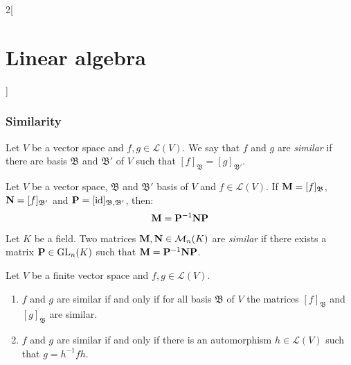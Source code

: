 \documentclass[../../../main.tex]{subfiles}
\begin{document}
\begin{multicols}{2}[\section{Linear algebra}]
  \subsubsection*{Similarity}
  \begin{definition}
    Let $V$ be a vector space and $f,g\in\mathcal{L}(V)$. We say that $f$ and $g$ are \textit{similar} if there are basis $\mathfrak{B}$ and $\mathfrak{B}'$ of $V$ such that $[f]_\mathfrak{B}=[g]_{\mathfrak{B}'}$.
  \end{definition}
  \begin{lemma}
    Let $V$ be a vector space, $\mathfrak{B}$ and $\mathfrak{B}'$ basis of $V$ and $f\in\mathcal{L}(V)$. If $\vb{M}=[f]_\mathfrak{B}$, $\vb{N}=[f]_{\mathfrak{B}'}$ and $\vb{P}=[\mathrm{id}]_{\mathfrak{B},\mathfrak{B}'}$, then: $$\vb{M}=\vb{P}^{-1}\vb{N}\vb{P}$$
  \end{lemma}
  \begin{definition}
    Let $K$ be a field. Two matrices $\vb{M}, \vb{N}\in\mathcal{M}_n(K)$ are \textit{similar} if there exists a matrix $\vb{P}\in\mathrm{GL}_n(K)$ such that $\vb{M}=\vb{P}^{-1}\vb{N}\vb{P}$.
  \end{definition}
  \begin{prop}
    Let $V$ be a finite vector space and $f,g\in\mathcal{L}(V)$.
    \begin{enumerate}
      \item $f$ and $g$ are similar if and only if for all basis $\mathfrak{B}$ of $V$ the matrices $[f]_\mathfrak{B}$ and $[g]_\mathfrak{B}$ are similar.
      \item $f$ and $g$ are similar if and only if there is an automorphism $h\in\mathcal{L}(V)$ such that $g=h^{-1}fh$.
    \end{enumerate}
  \end{prop}

\end{multicols}
\end{document}
